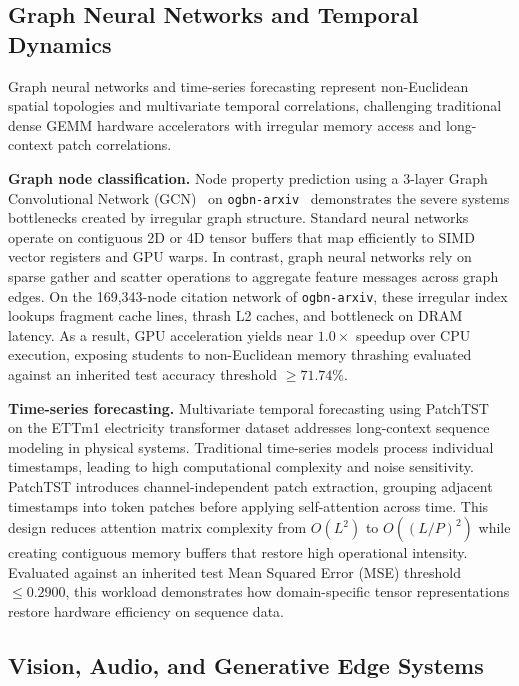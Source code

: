 \documentclass[10pt,twocolumn]{article}
\begin{document}
\subsection{Graph Neural Networks and Temporal Dynamics}
\label{sec:suite_graph}

Graph neural networks and time-series forecasting represent non-Euclidean spatial topologies and multivariate temporal correlations, challenging traditional dense GEMM hardware accelerators with irregular memory access and long-context patch correlations.

\textbf{Graph node classification.} Node property prediction using a 3-layer Graph Convolutional Network (GCN)~\citep{kipf2017gcn} on \texttt{ogbn-arxiv}~\citep{hu2020ogb} demonstrates the severe systems bottlenecks created by irregular graph structure. Standard neural networks operate on contiguous 2D or 4D tensor buffers that map efficiently to SIMD vector registers and GPU warps. In contrast, graph neural networks rely on sparse gather and scatter operations to aggregate feature messages across graph edges. On the 169,343-node citation network of \texttt{ogbn-arxiv}, these irregular index lookups fragment cache lines, thrash L2 caches, and bottleneck on DRAM latency. As a result, GPU acceleration yields near $1.0\times$ speedup over CPU execution, exposing students to non-Euclidean memory thrashing evaluated against an inherited test accuracy threshold $\ge 71.74\%$.

\textbf{Time-series forecasting.} Multivariate temporal forecasting using PatchTST~\citep{nie2023patchtst} on the ETTm1 electricity transformer dataset addresses long-context sequence modeling in physical systems. Traditional time-series models process individual timestamps, leading to high computational complexity and noise sensitivity. PatchTST introduces channel-independent patch extraction, grouping adjacent timestamps into token patches before applying self-attention across time. This design reduces attention matrix complexity from $O(L^2)$ to $O((L/P)^2)$ while creating contiguous memory buffers that restore high operational intensity. Evaluated against an inherited test Mean Squared Error (MSE) threshold $\le 0.2900$, this workload demonstrates how domain-specific tensor representations restore hardware efficiency on sequence data.

\subsection{Vision, Audio, and Generative Edge Systems}
\label{sec:suite_vision}
\end{document}
